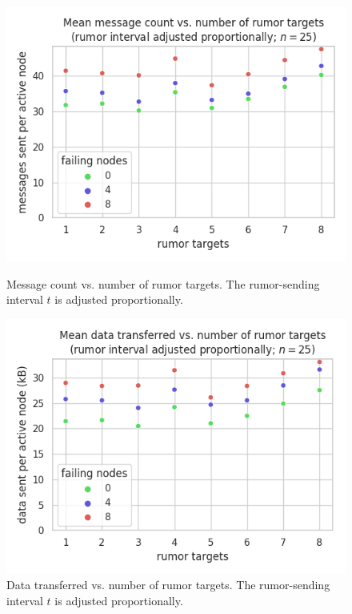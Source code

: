 \begin{figure}[H]
    \centering
    \begin{minipage}{0.5\textwidth}
        \centering
        \includegraphics[width=\textwidth]{figures/9/bandwidth_msg_tx_sum_by_rumor_targets.png}
        \captionsetup{labelformat=empty}
        \caption{Message count vs. number of rumor targets. The rumor-sending interval $t$ is adjusted proportionally.}
    \end{minipage}\hfill
    \begin{minipage}{0.5\textwidth}
        \centering
        \includegraphics[width=\textwidth]{figures/9/bandwidth_tx_sum_by_rumor_targets.png}
        \captionsetup{labelformat=empty}
        \caption{Data transferred vs. number of rumor targets. The rumor-sending interval $t$ is adjusted proportionally.}
    \end{minipage}\hfill
\end{figure}


